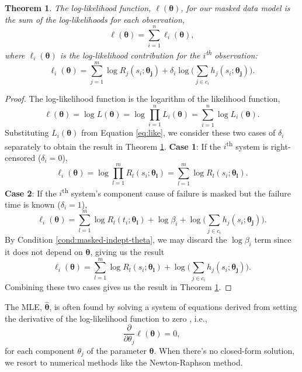 \documentclass[
]{article}
\theoremstyle{definition}
\theoremstyle{plain}
\newtheorem{theorem}{Theorem}[section]
\theoremstyle{definition}
\theoremstyle{definition}
\theoremstyle{definition}
\theoremstyle{definition}
\theoremstyle{remark}
\begin{document}
\begin{theorem}
\protect\hypertarget{thm:loglike-total}{}\label{thm:loglike-total}The log-likelihood function, \(\ell(\boldsymbol{\theta})\), for our masked data model is the sum of the log-likelihoods for each observation,
\begin{equation}
\label{eq:loglike}
\ell(\boldsymbol{\theta}) = \sum_{i=1}^n \ell_i(\boldsymbol{\theta}),
\end{equation}
where \(\ell_i(\boldsymbol{\theta})\) is the log-likelihood contribution for the \(i\)\textsuperscript{th} observation:
\begin{equation}
\ell_i(\boldsymbol{\theta}) = \sum_{j=1}^m \log R_j(s_i;\boldsymbol{\theta_j}) +
    \delta_i \log \biggl(\sum_{j\in c_i} h_j(s_i;\boldsymbol{\theta_j}) \biggr).
\end{equation}
\end{theorem}

\begin{proof}
The log-likelihood function is the logarithm of the likelihood function,
\[
\ell(\boldsymbol{\theta}) = \log L(\boldsymbol{\theta}) = \log \prod_{i=1}^n L_i(\boldsymbol{\theta}) =
    \sum_{i=1}^n \log L_i(\boldsymbol{\theta}).
\]
Substituting \(L_i(\boldsymbol{\theta})\) from Equation \eqref{eq:like}, we consider these two
cases of \(\delta_i\) separately to obtain the result in Theorem
\ref{thm:loglike-total}.
\textbf{Case 1}: If the \(i\)\textsuperscript{th} system is right-censored (\(\delta_i = 0\)),
\[
\ell_i(\boldsymbol{\theta}) = \log \prod_{l=1}^m R_l(s_i;\boldsymbol{\theta_l}) =
    \sum_{l=1}^m \log R_l(s_i;\boldsymbol{\theta_l}).
\]
\textbf{Case 2}: If the \(i\)\textsuperscript{th} system's component cause of failure is masked but
the failure time is known (\(\delta_i = 1\)),
\[
\ell_i(\boldsymbol{\theta}) = \sum_{l=1}^m \log R_l(t_i;\boldsymbol{\theta_l}) + \log \beta_i +
    \log \biggl(\sum_{j\in c_i} h_j(s_i;\boldsymbol{\theta_j})\biggr).
\]
By Condition \ref{cond:masked-indept-theta},
we may discard the \(\log \beta_i\) term since it does not depend on \(\boldsymbol{\theta}\),
giving us the result
\[
\ell_i(\boldsymbol{\theta}) = \sum_{l=1}^m \log R_l(s_i;\boldsymbol{\theta_l}) +
    \log \biggl(\sum_{j\in c_i} h_j(s_i;\boldsymbol{\theta_j}) \biggr).
\]
Combining these two cases gives us the result in Theorem \ref{thm:loglike-total}.
\end{proof}

The MLE, \(\hat{\boldsymbol{\theta}}\), is often found by solving a system of equations
derived from setting the derivative of the log-likelihood function to zero
\citep{bain1992}, i.e.,
\begin{equation}
\label{eq:mle-eq}
\frac{\partial}{\partial \theta_j} \ell(\boldsymbol{\theta}) = 0,
\end{equation}
for each component \(\theta_j\) of the parameter \(\boldsymbol{\theta}\). When there's no
closed-form solution, we resort to numerical methods like the Newton-Raphson
method.
\end{document}
